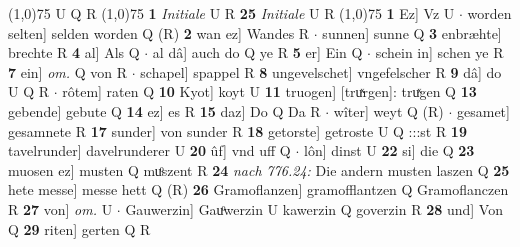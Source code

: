 \documentclass[8pt,a4paper,notitlepage]{article}
\begin{document}
\begin{table}[ht]
\begin{minipage}[t]{0.5\linewidth}
\line(1,0){75} \newline
U Q R \newline
\line(1,0){75} \newline
\textbf{1} \textit{Initiale} U R  \textbf{25} \textit{Initiale} U R  \newline
\line(1,0){75} \newline
\textbf{1} Ez] Vz U  $\cdot$ worden selten] selden worden Q (R) \textbf{2} wan ez] Wandes R  $\cdot$ sunnen] sunne Q \textbf{3} enbræhte] brechte R \textbf{4} al] Als Q  $\cdot$ al dâ] auch do Q ye R \textbf{5} er] Ein Q  $\cdot$ schein in] schen ye R \textbf{7} ein] \textit{om.} Q von R  $\cdot$ schapel] spappel R \textbf{8} ungevelschet] vngefelscher R \textbf{9} dâ] do U Q R  $\cdot$ rôtem] raten Q \textbf{10} Kyot] koyt U \textbf{11} truogen] [truͯrgen]: truͯgen Q \textbf{13} gebende] gebute Q \textbf{14} ez] es R \textbf{15} daz] Do Q Da R  $\cdot$ wîter] weyt Q (R)  $\cdot$ gesamet] gesamnete R \textbf{17} sunder] von sunder R \textbf{18} getorste] getroste U Q :::st R \textbf{19} tavelrunder] davelrunderer U \textbf{20} ûf] vnd uff Q  $\cdot$ lôn] dinst U \textbf{22} si] die Q \textbf{23} muosen ez] musten Q muͦszent R \textbf{24} \textit{nach 776.24:} Die andern musten laszen Q  \textbf{25} hete messe] messe hett Q (R) \textbf{26} Gramoflanzen] gramofflantzen Q Gramoflanczen R \textbf{27} von] \textit{om.} U  $\cdot$ Gauwerzin] Gauͦwerzin U kawerzin Q goverzin R \textbf{28} und] Von Q \textbf{29} riten] gerten Q R \newline
\end{minipage}
\end{table}
\end{document}
